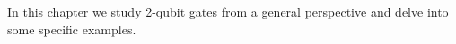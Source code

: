 
In this chapter we study 2-qubit gates from a general perspective and delve into some specific examples.
